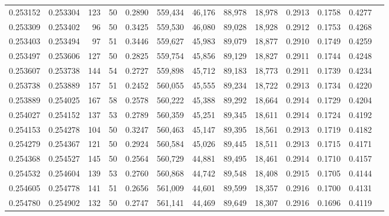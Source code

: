\begin{tabular}{rrrrrrrrrrrrr}
0.253152 & 0.253304 &   123 &  50 &                                     0.2890 & 559,434 &  46,176 &  88,978 &  18,978 & 0.2913 & 0.1758 & 0.4277 \\
0.253309 & 0.253402 &    96 &  50 &                                     0.3425 & 559,530 &  46,080 &  89,028 &  18,928 & 0.2912 & 0.1753 & 0.4268 \\
0.253403 & 0.253494 &    97 &  51 &                                     0.3446 & 559,627 &  45,983 &  89,079 &  18,877 & 0.2910 & 0.1749 & 0.4259 \\
0.253497 & 0.253606 &   127 &  50 &                                     0.2825 & 559,754 &  45,856 &  89,129 &  18,827 & 0.2911 & 0.1744 & 0.4248 \\
0.253607 & 0.253738 &   144 &  54 &                                     0.2727 & 559,898 &  45,712 &  89,183 &  18,773 & 0.2911 & 0.1739 & 0.4234 \\
0.253738 & 0.253889 &   157 &  51 &                                     0.2452 & 560,055 &  45,555 &  89,234 &  18,722 & 0.2913 & 0.1734 & 0.4220 \\
0.253889 & 0.254025 &   167 &  58 &                                     0.2578 & 560,222 &  45,388 &  89,292 &  18,664 & 0.2914 & 0.1729 & 0.4204 \\
0.254027 & 0.254152 &   137 &  53 &                                     0.2789 & 560,359 &  45,251 &  89,345 &  18,611 & 0.2914 & 0.1724 & 0.4192 \\
0.254153 & 0.254278 &   104 &  50 &                                     0.3247 & 560,463 &  45,147 &  89,395 &  18,561 & 0.2913 & 0.1719 & 0.4182 \\
0.254279 & 0.254367 &   121 &  50 &                                     0.2924 & 560,584 &  45,026 &  89,445 &  18,511 & 0.2913 & 0.1715 & 0.4171 \\
0.254368 & 0.254527 &   145 &  50 &                                     0.2564 & 560,729 &  44,881 &  89,495 &  18,461 & 0.2914 & 0.1710 & 0.4157 \\
0.254532 & 0.254604 &   139 &  53 &                                     0.2760 & 560,868 &  44,742 &  89,548 &  18,408 & 0.2915 & 0.1705 & 0.4144 \\
0.254605 & 0.254778 &   141 &  51 &                                     0.2656 & 561,009 &  44,601 &  89,599 &  18,357 & 0.2916 & 0.1700 & 0.4131 \\
0.254780 & 0.254902 &   132 &  50 &                                     0.2747 & 561,141 &  44,469 &  89,649 &  18,307 & 0.2916 & 0.1696 & 0.4119 \\

\end{tabular}
